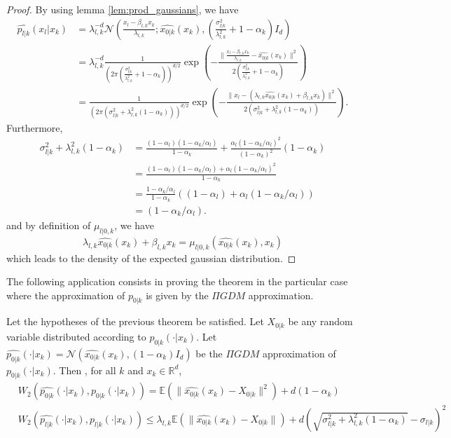 \documentclass[12pt]{article}
\begin{document}
\begin{proof}
    By using lemma \ref{lem:prod_gaussians}, we have
    \begin{align*}
        \hat{p_{l|k}}(x_l | x_k)
        & = \lambda_{l,k}^{-d} 
        \mathcal{N}\left( \frac{x_l - \beta_{l,k}x_k}{\lambda_{l,k}}; \hat{x_{0|k}}(x_k), 
        (\frac{\sigma^2_{l|k}}{\lambda_{l,k}^2} + 1 - \alpha_k) I_d \right) \\
        & = \lambda_{l,k}^{-d} \frac{1}{(2 \pi (\frac{\sigma^2_{l|k}}{\lambda_{l,k}^2} + 1 - \alpha_k))^{d/2}}
        \exp\left( -\frac{\| \frac{x_l - \beta_{l,k}x_k}{\lambda_{l,k}} - \hat{x_{0|k}}(x_k) \|^2}{2(\frac{\sigma^2_{l|k}}{\lambda_{l,k}^2} + 1 - \alpha_k)} \right)\\
        & = \frac{1}{(2 \pi ( \sigma^2_{l|k} + \lambda_{l,k}^2(1-\alpha_k)))^{d/2}}
        \exp\left( -\frac{\| x_l - (\lambda_{l,k} \hat{x_{0|k}}(x_k) + \beta_{l,k} x_k) \|^2}{2 (\sigma^2_{l|k} + \lambda_{l,k}^2(1-\alpha_k))} \right).
    \end{align*}
    Furthermore, 
    \begin{align*}
        \sigma^2_{l|k} + \lambda_{l,k}^2(1-\alpha_k) 
        &= \frac{(1 - \alpha_l)(1 - \alpha_k/\alpha_l)}{1 - \alpha_k} + \frac{\alpha_l(1 - \alpha_k/\alpha_l)^2}{(1 - \alpha_k)^2}(1 - \alpha_k) \\
        &= \frac{(1 - \alpha_l)(1 - \alpha_k/\alpha_l) + \alpha_l(1 - \alpha_k/\alpha_l)^2}{1 - \alpha_k} \\
        &= \frac{1-\alpha_k/\alpha_l}{1 - \alpha_k} \left( (1 - \alpha_l) + \alpha_l(1 - \alpha_k/\alpha_l) \right) \\
        &= (1 - \alpha_k/\alpha_l).
    \end{align*} 
    and by definition of $\mu_{l|0,k}$, we have
    $$\lambda_{l,k} \hat{x_{0|k}}(x_k) + \beta_{l,k} x_k 
    = \mu_{l|0,k}(\hat{x_{0|k}}(x_k), x_k)$$
    which leads to the density of the expected gaussian distribution.
\end{proof}

The following application consists in proving the theorem in the particular case where
the approximation of $p_{0|k}$ is given by the $\Pi GDM$ approximation.

\begin{application}
    Let the hypotheses of the previous theorem be satisfied.
    Let $X_{0|k}$ be any random variable distributed according to $p_{0|k}(\cdot | x_k)$.
    Let $\hat{p_{0|k}}(\cdot | x_k) = \mathcal{N}(\hat{x_{0|k}}(x_k), (1 - \alpha_k) I_d)$ 
    be the $\Pi GDM$ approximation of $p_{0|k}(\cdot | x_k)$.
    Then , for all $k$ and $x_k \in \mathbb{R}^d$, 
    \begin{align*}
    & W_2(\hat{p_{0|k}}(\cdot | x_k), p_{0|k}(\cdot | x_k)) 
    = \mathbb{E}(\| \hat{x_{0|k}}(x_k) - X_{0|k} \|^2) + d(1-\alpha_k)\\
    & W_2(\hat{p_{l|k}}(\cdot | x_k), p_{l|k}(\cdot | x_k)) 
    \leq \lambda_{l,k} \mathbb{E}(\| \hat{x_{0|k}}(x_k) - X_{0|k} \|) 
    + d(\sqrt{\sigma_{l|k}^2 + \lambda_{l,k}^2(1-\alpha_k)} - \sigma_{l|k})^2
    \end{align*}
\end{application}
\end{document}
